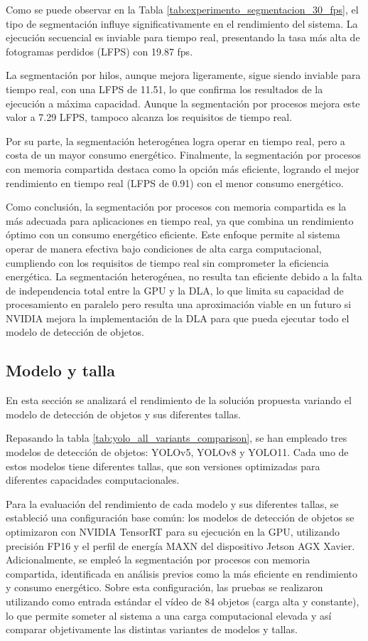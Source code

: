 \documentclass[11pt,spanish,listoffigures,listoftables]{tfgetsinf}
\begin{document}
Como se puede observar en la Tabla \ref{tab:experimento_segmentacion_30_fps}, el tipo de segmentación influye significativamente en el rendimiento del sistema. La ejecución secuencial es inviable para tiempo real, presentando la tasa más alta de fotogramas perdidos (LFPS) con 19.87 fps.

La segmentación por hilos, aunque mejora ligeramente, sigue siendo inviable para tiempo real, con una LFPS de 11.51, lo que confirma los resultados de la ejecución a máxima capacidad. Aunque la segmentación por procesos mejora este valor a 7.29 LFPS, tampoco alcanza los requisitos de tiempo real.

Por su parte, la segmentación heterogénea logra operar en tiempo real, pero a costa de un mayor consumo energético. Finalmente, la segmentación por procesos con memoria compartida destaca como la opción más eficiente, logrando el mejor rendimiento en tiempo real (LFPS de 0.91) con el menor consumo energético.

Como conclusión, la segmentación por procesos con memoria compartida es la más adecuada para aplicaciones en tiempo real, ya que combina un rendimiento óptimo con un consumo energético eficiente. Este enfoque permite al sistema operar de manera efectiva bajo condiciones de alta carga computacional, cumpliendo con los requisitos de tiempo real sin comprometer la eficiencia energética. La segmentación heterogénea, no resulta tan eficiente debido a la falta de independencia total entre la GPU y la DLA, lo que limita su capacidad de procesamiento en paralelo pero resulta una aproximación viable en un futuro si NVIDIA mejora la implementación de la DLA para que pueda ejecutar todo el modelo de detección de objetos.

\subsection{Modelo y talla} \label{sub:modelo_talla}
En esta sección se analizará el rendimiento de la solución propuesta variando el modelo de detección de objetos y sus diferentes tallas.

Repasando la tabla \ref{tab:yolo_all_variants_comparison}, se han empleado tres modelos de detección de objetos: YOLOv5, YOLOv8 y YOLO11. Cada uno de estos modelos tiene diferentes tallas, que son versiones optimizadas para diferentes capacidades computacionales. 

Para la evaluación del rendimiento de cada modelo y sus diferentes tallas, se estableció una configuración base común: los modelos de detección de objetos se optimizaron con NVIDIA TensorRT para su ejecución en la GPU, utilizando precisión FP16 y el perfil de energía MAXN del dispositivo Jetson AGX Xavier. Adicionalmente, se empleó la segmentación por procesos con memoria compartida, identificada en análisis previos como la más eficiente en rendimiento y consumo energético. Sobre esta configuración, las pruebas se realizaron utilizando como entrada estándar el vídeo de 84 objetos (carga alta y constante), lo que permite someter al sistema a una carga computacional elevada y así comparar objetivamente las distintas variantes de modelos y tallas.
\end{document}
